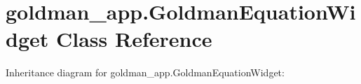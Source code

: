 \hypertarget{classgoldman__app_1_1GoldmanEquationWidget}{}\section{goldman\+\_\+app.\+Goldman\+Equation\+Widget Class Reference}
\label{classgoldman__app_1_1GoldmanEquationWidget}


Inheritance diagram for goldman\+\_\+app.\+Goldman\+Equation\+Widget\+:
